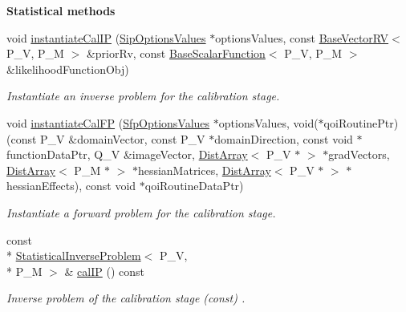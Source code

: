 \begin{Indent}{\bf Statistical methods}\par
\begin{DoxyCompactItemize}
\item 
void \hyperlink{class_q_u_e_s_o_1_1_validation_cycle_af13cd3bac365d8a5b0338ba662741c5e}{instantiate\-Cal\-I\-P} (\hyperlink{class_q_u_e_s_o_1_1_sip_options_values}{Sip\-Options\-Values} $\ast$options\-Values, const \hyperlink{class_q_u_e_s_o_1_1_base_vector_r_v}{Base\-Vector\-R\-V}$<$ P\-\_\-\-V, P\-\_\-\-M $>$ \&prior\-Rv, const \hyperlink{class_q_u_e_s_o_1_1_base_scalar_function}{Base\-Scalar\-Function}$<$ P\-\_\-\-V, P\-\_\-\-M $>$ \&likelihood\-Function\-Obj)
\begin{DoxyCompactList}\small\item\em Instantiate an inverse problem for the calibration stage. \end{DoxyCompactList}\item 
void \hyperlink{class_q_u_e_s_o_1_1_validation_cycle_a2ae0650115037337b454a85ae2a0990f}{instantiate\-Cal\-F\-P} (\hyperlink{class_q_u_e_s_o_1_1_sfp_options_values}{Sfp\-Options\-Values} $\ast$options\-Values, void($\ast$qoi\-Routine\-Ptr)(const P\-\_\-\-V \&domain\-Vector, const P\-\_\-\-V $\ast$domain\-Direction, const void $\ast$function\-Data\-Ptr, Q\-\_\-\-V \&image\-Vector, \hyperlink{class_q_u_e_s_o_1_1_dist_array}{Dist\-Array}$<$ P\-\_\-\-V $\ast$ $>$ $\ast$grad\-Vectors, \hyperlink{class_q_u_e_s_o_1_1_dist_array}{Dist\-Array}$<$ P\-\_\-\-M $\ast$ $>$ $\ast$hessian\-Matrices, \hyperlink{class_q_u_e_s_o_1_1_dist_array}{Dist\-Array}$<$ P\-\_\-\-V $\ast$ $>$ $\ast$hessian\-Effects), const void $\ast$qoi\-Routine\-Data\-Ptr)
\begin{DoxyCompactList}\small\item\em Instantiate a forward problem for the calibration stage. \end{DoxyCompactList}\item 
const \\*
\hyperlink{class_q_u_e_s_o_1_1_statistical_inverse_problem}{Statistical\-Inverse\-Problem}$<$ P\-\_\-\-V, \\*
P\-\_\-\-M $>$ \& \hyperlink{class_q_u_e_s_o_1_1_validation_cycle_a5a6cbe4851f3657e52a7302d82022233}{cal\-I\-P} () const 
\begin{DoxyCompactList}\small\item\em Inverse problem of the calibration stage (const) . \end{DoxyCompactList}\item 

\end{DoxyCompactItemize}
\end{Indent}
